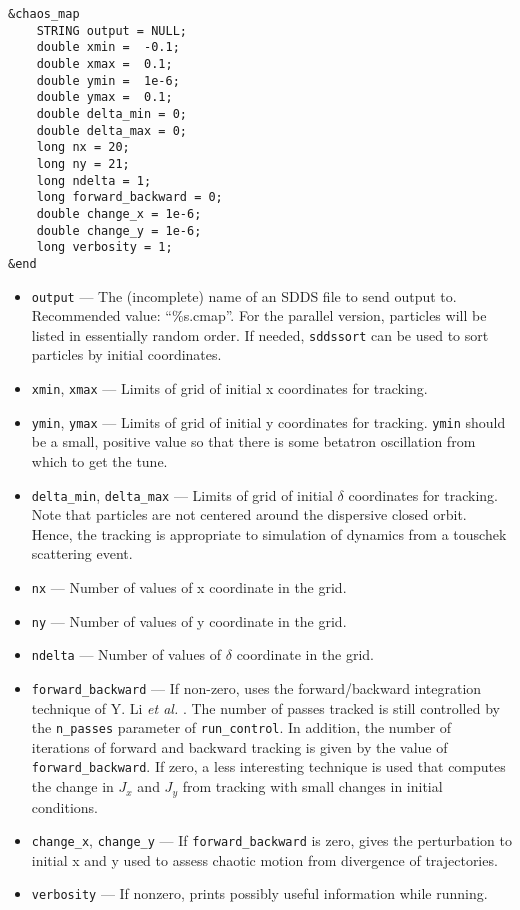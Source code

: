 \documentclass[11pt]{article}
\begin{document}
\begin{verbatim}
&chaos_map
    STRING output = NULL;
    double xmin =  -0.1;
    double xmax =  0.1;
    double ymin =  1e-6;
    double ymax =  0.1;
    double delta_min = 0;
    double delta_max = 0;
    long nx = 20;
    long ny = 21;
    long ndelta = 1;
    long forward_backward = 0;
    double change_x = 1e-6;
    double change_y = 1e-6;
    long verbosity = 1;
&end
\end{verbatim}

\begin{itemize}
\item \verb|output| --- The (incomplete) name of an SDDS file to send output to.  
 Recommended value: ``\%s.cmap''.  For the parallel version, particles will be listed in essentially
 random order.  If needed, \verb|sddssort| can be used to sort particles by initial coordinates.
\item \verb|xmin|, \verb|xmax| --- Limits of grid of initial x coordinates for tracking.             
\item \verb|ymin|, \verb|ymax| --- Limits of grid of initial y coordinates for tracking.             
 \verb|ymin| should be a small, positive value so that there                               
 is some betatron oscillation from which to get the tune.                      
\item \verb|delta_min|, \verb|delta_max| --- Limits of grid of initial $\delta$ coordinates
for tracking.  Note that particles are not centered around the dispersive closed orbit.  Hence,
the tracking is appropriate to simulation of dynamics from a touschek scattering event.
\item \verb|nx| --- Number of values of x coordinate in the grid.
\item \verb|ny| --- Number of values of y coordinate in the grid.
\item \verb|ndelta| --- Number of values of $\delta$ coordinate in the grid.
\item \verb|forward_backward| --- If non-zero, uses the forward/backward integration technique of Y. Li {\em et al.} 
  \cite{Li-arxiv-1912.00121}. The number of passes tracked is still controlled by the \verb|n_passes| parameter of 
  \verb|run_control|. In addition, the number of iterations of forward and backward tracking is given by the
  value of \verb|forward_backward|.
  If zero, a less interesting technique is used that computes the change in $J_x$ and $J_y$ from tracking with
  small changes in initial conditions.
\item \verb|change_x|, \verb|change_y| --- If  \verb|forward_backward| is zero, gives the perturbation to 
  initial x and y used to assess chaotic motion from divergence of trajectories.
\item \verb|verbosity| --- If nonzero, prints possibly useful information while running.
\end{itemize}
\end{document}
